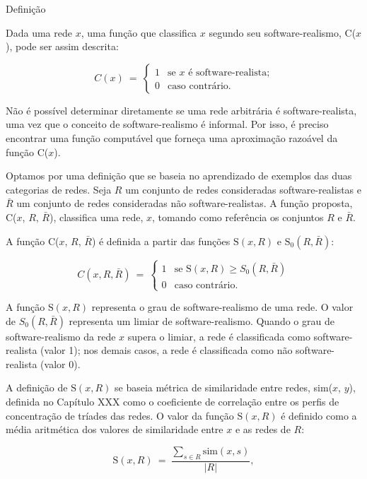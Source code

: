\begin{section}{Definição}

Dada uma rede $x$, uma função que classifica $x$ segundo seu software-realismo, C($x$), pode ser assim descrita:
	
$$
C(x) ~=~ 
\left\{
\begin{array}{cl}
1 & \mbox{se $x$ é software-realista;} \\
0 & \mbox{caso contrário.}
\end{array}
\right.
$$

Não é possível determinar diretamente se uma rede arbitrária é software-realista, uma vez que o conceito de software-realismo é informal. Por isso, é preciso encontrar uma função computável que forneça uma aproximação razoável da função C($x$). %

Optamos por uma definição que se baseia no aprendizado de exemplos das duas categorias de redes. Seja $R$ um conjunto de redes consideradas software-realistas e $\bar{R}$ um conjunto de redes consideradas não software-realistas. A função proposta, C($x$, $R$, $\bar{R}$), classifica uma rede, $x$, tomando como referência os conjuntos $R$ e $\bar{R}$.

A função C($x$, $R$, $\bar{R}$) é definida a partir das funções $\mathrm{S}(x, R)$ e $\mathrm{S}_0(R, \bar{R})$:

$$
C(x, R, \bar{R}) ~=~ 
\left\{
\begin{array}{cl}
1 & \mbox{se } \mathrm{S}(x, R) \ge S_0(R, \bar{R}) \\
0 & \mbox{caso contrário.}
\end{array}
\right.
$$

A função $\mathrm{S}(x, R)$ representa o grau de software-realismo de uma rede. O valor de $S_0(R, \bar{R})$ representa um limiar de software-realismo. Quando o grau de software-realismo da rede $x$ supera o limiar, a rede é classificada como software-realista (valor 1); nos demais casos, a rede é classificada como não software-realista (valor 0).

A definição de $\mathrm{S}(x, R)$ se baseia métrica de similaridade entre redes, sim($x$, $y$), definida no Capítulo XXX como o coeficiente de correlação entre os perfis de concentração de tríades das redes. O valor da função $\mathrm{S}(x, R)$ é definido como a média aritmética dos valores de similaridade entre $x$ e as redes de $R$:

$$
\mathrm{S}(x, R) ~=~ \frac{
\displaystyle\sum_{s \in R} \mathrm{sim}(x, s)
}{|R|} \mathrm{,}
$$


\end{section}
